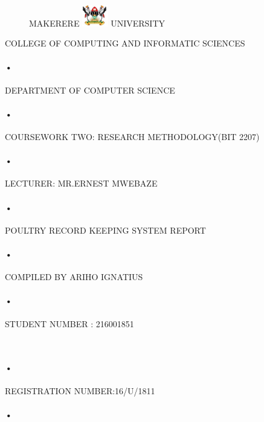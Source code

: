 \documentclass[10pt,a4paper]{article}
\begin{document}
\begin{titlepage}
 \begin{figure}[h]
  \centerline{\small MAKERERE 
  \includegraphics[width=0.1\textwidth]{muklog} UNIVERSITY}
\end{figure}
\centerline{COLLEGE OF COMPUTING AND INFORMATIC SCIENCES}
\paragraph{•}
\centerline{DEPARTMENT OF COMPUTER SCIENCE\\}
\paragraph{•}

\centerline{COURSEWORK TWO: RESEARCH METHODOLOGY(BIT 2207)\\}
\paragraph{•}
\centerline{LECTURER: MR.ERNEST MWEBAZE}
\paragraph{•}
\centerline{POULTRY RECORD KEEPING SYSTEM REPORT\\}
\paragraph{•}
\centerline{COMPILED BY
 ARIHO IGNATIUS}
 \paragraph{•}
\centerline{STUDENT NUMBER : 216001851}\
\paragraph{•}
\centerline{REGISTRATION NUMBER:16/U/1811}
\paragraph{•}
\end{titlepage}
\tableofcontents
\newpage
{}
\end{document}
